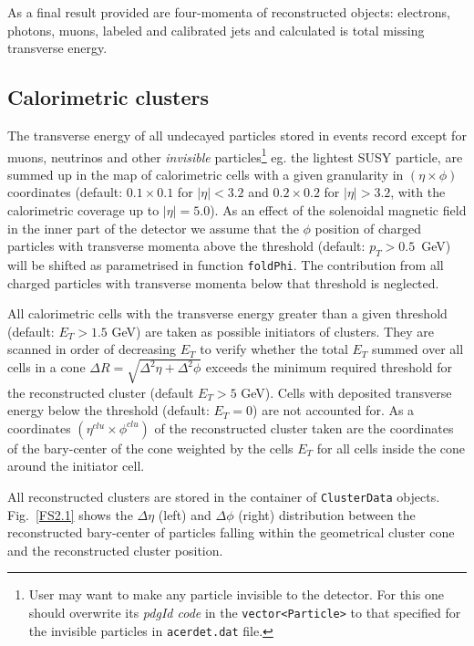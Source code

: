 As a final result provided are four-momenta of reconstructed objects:
electrons, photons, muons, labeled and calibrated jets and calculated is
total missing transverse energy. 


\boldmath 
\subsection{Calorimetric clusters}
\unboldmath

 The transverse energy of all undecayed particles stored in events record
 except for muons, neutrinos and other 
 {\it invisible} particles\footnote{User may want to make any particle
 invisible to the detector. For this one should overwrite its {\it pdgId code} 
 in the  {\tt vector<Particle>} to that specified for the invisible particles 
 in {\tt acerdet.dat} file.} eg. the lightest SUSY particle,
 are summed up in the map of
 calorimetric cells with a given granularity in $(\eta \times \phi)$
 coordinates (default: $0.1 \times 0.1$ for $|\eta| < 3.2$ and 
 $0.2 \times 0.2$ for  $|\eta| > 3.2$, with the calorimetric coverage
 up to  $|\eta| = 5.0$). As an effect of the solenoidal magnetic field
 in  the inner part of the detector we assume that the $\phi$ position of charged
 particles with transverse momenta above  the threshold 
 (default: $p_T > 0.5$~GeV) will be shifted as parametrised in function
 {\tt  foldPhi}. The contribution from all charged particles with
 transverse momenta  below that threshold is neglected.

 All calorimetric cells with the transverse energy greater than a
 given threshold (default: $E_T > 1.5$ GeV) are taken as possible
 initiators of clusters. They are scanned in order of decreasing $E_T$
 to verify whether the total $E_T$ summed over all cells in a cone
 $\Delta R = \sqrt{ \Delta^2 \eta + \Delta^2 \phi}$ exceeds the
 minimum required threshold for the reconstructed cluster (default
 $E_T > 5$ GeV). Cells with deposited transverse energy below the
 threshold (default: $E_T=0$) are not accounted for. As a coordinates
 $(\eta^{clu} \times \phi^{clu})$ of the reconstructed cluster
 taken are the coordinates of the bary-center of the cone weighted
 by the cells $E_T$ for all cells inside the cone around the
 initiator cell.

 All reconstructed clusters are stored in the container of {\tt ClusterData} objects.
 Fig.~\ref{FS2.1} shows the  $\Delta \eta$ (left) and  $\Delta \phi$ (right) distribution
 between the reconstructed bary-center of particles falling within the
 geometrical cluster cone  and the reconstructed cluster position.

